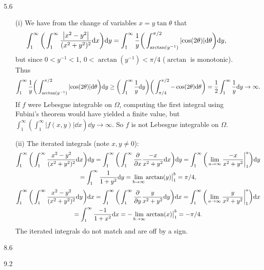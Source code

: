 \documentclass[11pt]{article}
\begin{document}
\begin{enumerate}
    \hrulefill
    \item[5.6] \begin{enumerate}
        \item[(i)] We have from the change of variables $x=y\tan \theta $ that 
        \[\int_1^\infty\bigg(\int_1^\infty \frac{\abs{x^2-y^2}}{(x^2+y^2)^2} \dd x\bigg)\dd y = \int_{1}^\infty \frac{1}{y} \bigg(\int_{\arctan(y^{-1})}^{\pi/2}\abs{\cos(2\theta)}\dd \theta\bigg) \dd y,\] but since $0<y^{-1}< 1$, $0 < \arctan(y^{-1}) < \pi/4$ ($\arctan$ is monotonic). Thus 
        \[\int_{1}^\infty \frac{1}{y} \bigg(\int_{\arctan(y^{-1})}^{\pi/2}\abs{\cos(2\theta)}\dd \theta\bigg) \dd y\geq \bigg(\int_{1}^\infty \frac{1}{y} \dd y\bigg)\bigg(\int_{\pi/4}^{\pi/2}-\cos(2\theta)\dd \theta\bigg) = \frac{1}{2}\int_1^\infty \frac{1}{y}\dd y \to \infty.\] If $f$ were Lebesgue integrable on $\Omega$, computing the first integral using Fubini's theorem would have yielded a finite value, but $\int_1^\infty (\int_1^\infty |f(x,y)|\dd x) \dd y \to \infty$. So $f$ is not Lebesgue integrable on $\Omega$.
        \item[(ii)] The iterated integrals (note $x,y\neq 0$): 
        \begin{multline*}
            \int_1^\infty\bigg(\int_1^\infty \frac{x^2-y^2}{(x^2+y^2)^2} \dd x\bigg)\dd y = \int_1^\infty\bigg(\int_1^\infty \pdv{x}\frac{-x}{x^2+y^2} \dd x\bigg)\dd y = \int_1^\infty\bigg(\lim_{a\to\infty} \frac{-x}{x^2+y^2}\bigg|_{1}^a \bigg)\dd y \\
            = \int_1^\infty \frac{1}{1+y^2}\dd y = \lim_{b\to\infty} \arctan(y)\big|_{1}^b = \pi/4,
        \end{multline*}\begin{multline*}
            \int_1^\infty\bigg(\int_1^\infty \frac{x^2-y^2}{(x^2+y^2)^2} \dd y\bigg)\dd x = \int_1^\infty\bigg(\int_1^\infty \pdv{y}\frac{y}{x^2+y^2} \dd y\bigg)\dd x = \int_1^\infty\bigg(\lim_{a\to\infty} \frac{y}{x^2+y^2}\bigg|_{1}^a\bigg)\dd x \\
            = \int_1^\infty \frac{-1}{1+x^2}\dd x = -\lim_{b\to\infty} \arctan(x)\big|_{1}^b = -\pi/4.
        \end{multline*}
        The iterated integrals do not match and are off by a sign.
    \end{enumerate}
    \hrulefill
    \item[8.6]
    
    \hrulefill
    \item[9.2]
    
    \hrulefill
\end{enumerate}
\vspace*{7em}
\end{document}

